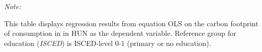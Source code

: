 \begin{table}[htbp!]
\begin{adjustbox}{width = 1\textwidth, max height = 0.95\textheight, center}
\begin{threeparttable}[b]
         \begin{tablenotes}\item \medskip \textit{Note:}
            \item This table displays regression results from equation OLS on the carbon footprint of consumption in  in HUN as the dependent variable.  Reference group for education (\textit{ISCED}) is ISCED-level 0-1 (primary or no education).
         \end{tablenotes}
      \end{threeparttable}
   \end{adjustbox}
\end{table}


